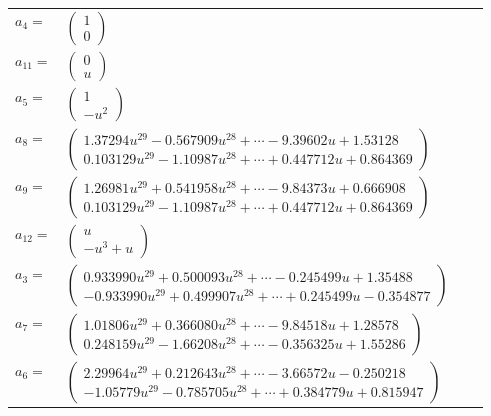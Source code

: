 \documentclass[1p]{elsarticle_modified}
\theoremstyle{definition}
\begin{document}
\begin{tabular}{m{7pt} m{180pt} m{7pt} m{180pt} }
\flushright $a_{4}=$&$\begin{pmatrix}1\\0\end{pmatrix}$ \\
\flushright $a_{11}=$&$\begin{pmatrix}0\\u\end{pmatrix}$ \\
\flushright $a_{5}=$&$\begin{pmatrix}1\\- u^2\end{pmatrix}$ \\
\flushright $a_{8}=$&$\begin{pmatrix}1.37294 u^{29}-0.567909 u^{28}+\cdots-9.39602 u+1.53128\\0.103129 u^{29}-1.10987 u^{28}+\cdots+0.447712 u+0.864369\end{pmatrix}$ \\
\flushright $a_{9}=$&$\begin{pmatrix}1.26981 u^{29}+0.541958 u^{28}+\cdots-9.84373 u+0.666908\\0.103129 u^{29}-1.10987 u^{28}+\cdots+0.447712 u+0.864369\end{pmatrix}$ \\
\flushright $a_{12}=$&$\begin{pmatrix}u\\- u^3+u\end{pmatrix}$ \\
\flushright $a_{3}=$&$\begin{pmatrix}0.933990 u^{29}+0.500093 u^{28}+\cdots-0.245499 u+1.35488\\-0.933990 u^{29}+0.499907 u^{28}+\cdots+0.245499 u-0.354877\end{pmatrix}$ \\
\flushright $a_{7}=$&$\begin{pmatrix}1.01806 u^{29}+0.366080 u^{28}+\cdots-9.84518 u+1.28578\\0.248159 u^{29}-1.66208 u^{28}+\cdots-0.356325 u+1.55286\end{pmatrix}$ \\
\flushright $a_{6}=$&$\begin{pmatrix}2.29964 u^{29}+0.212643 u^{28}+\cdots-3.66572 u-0.250218\\-1.05779 u^{29}-0.785705 u^{28}+\cdots+0.384779 u+0.815947\end{pmatrix}$ \\

\end{tabular}
\end{document}
